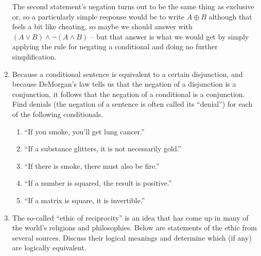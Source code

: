 \begin{enumerate}
{The second statement's negation turns out to be the same thing as exclusive or, so a particularly
simple response would be to write $A \oplus B$ although that feels a bit like cheating, so
maybe we should answer with $(A \lor B) \land {\lnot}(A \land B)$ -- but that answer is what we
would get by simply applying the rule for negating a conditional and doing no further simplification.
}

\workbookpagebreak

\item Because a conditional sentence is equivalent to a certain disjunction, and 
because DeMorgan's law tells us that the negation of a disjunction is a conjunction,
it follows that the negation of a conditional is a conjunction.  Find denials (the negation
of a sentence is often called its ``denial'') for each of the following conditionals.

\begin{enumerate}
\item ``If you smoke, you'll get lung cancer.''
\item ``If a substance glitters, it is not necessarily gold.''
\item ``If there is smoke, there must also be fire.''
\item ``If a number is squared, the result is positive.''
\item ``If a matrix is square, it is invertible.''
\end{enumerate}

\wbvfill


\hintspagebreak
\workbookpagebreak

\item The so-called ``ethic of reciprocity'' is an idea that has come 
up in many of the world's religions and philosophies.  
Below are statements of the ethic
from several sources.  Discuss their logical meanings and determine which (if 
any) are logically equivalent.


\end{enumerate}
